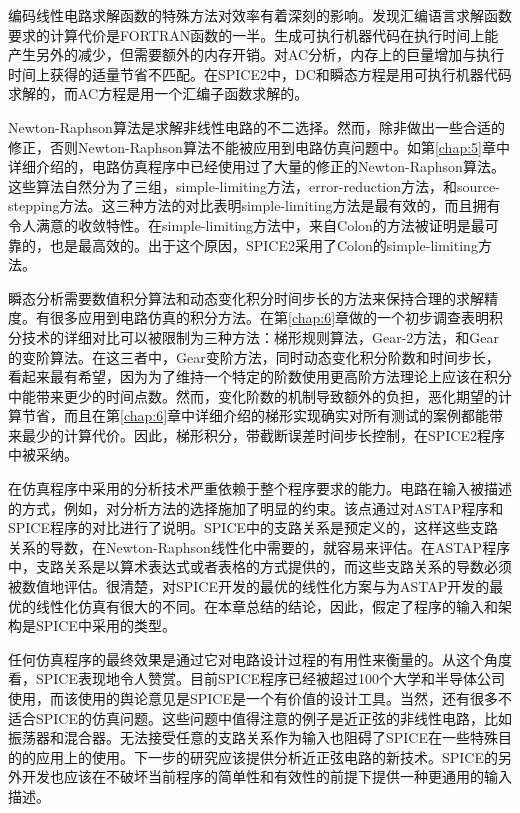 编码线性电路求解函数的特殊方法对效率有着深刻的影响。发现汇编语言求解函数要求的计算代价是FORTRAN函数的一半。生成可执行机器代码在执行时间上能产生另外的减少，但需要额外的内存开销。对AC分析，内存上的巨量增加与执行时间上获得的适量节省不匹配。在SPICE2中，DC和瞬态方程是用可执行机器代码求解的，而AC方程是用一个汇编子函数求解的。

Newton-Raphson算法是求解非线性电路的不二选择。然而，除非做出一些合适的修正，否则Newton-Raphson算法不能被应用到电路仿真问题中。如第\ref{chap:5}章中详细介绍的，电路仿真程序中已经使用过了大量的修正的Newton-Raphson算法。这些算法自然分为了三组，simple-limiting方法，error-reduction方法，和source-stepping方法。这三种方法的对比表明simple-limiting方法是最有效的，而且拥有令人满意的收敛特性。在simple-limiting方法中，来自Colon的方法被证明是最可靠的，也是最高效的。出于这个原因，SPICE2采用了Colon的simple-limiting方法。

瞬态分析需要数值积分算法和动态变化积分时间步长的方法来保持合理的求解精度。有很多应用到电路仿真的积分方法。在第\ref{chap:6}章做的一个初步调查表明积分技术的详细对比可以被限制为三种方法：梯形规则算法，Gear-2方法，和Gear的变阶算法。在这三者中，Gear变阶方法，同时动态变化积分阶数和时间步长，看起来最有希望，因为为了维持一个特定的阶数使用更高阶方法理论上应该在积分中能带来更少的时间点数。然而，变化阶数的机制导致额外的负担，恶化期望的计算节省，而且在第\ref{chap:6}章中详细介绍的梯形实现确实对所有测试的案例都能带来最少的计算代价。因此，梯形积分，带截断误差时间步长控制，在SPICE2程序中被采纳。

在仿真程序中采用的分析技术严重依赖于整个程序要求的能力。电路在输入被描述的方式，例如，对分析方法的选择施加了明显的约束。该点通过对ASTAP程序和SPICE程序的对比进行了说明。SPICE中的支路关系是预定义的，这样这些支路关系的导数，在Newton-Raphson线性化中需要的，就容易来评估。在ASTAP程序中，支路关系是以算术表达式或者表格的方式提供的，而这些支路关系的导数必须被数值地评估。很清楚，对SPICE开发的最优的线性化方案与为ASTAP开发的最优的线性化仿真有很大的不同。在本章总结的结论，因此，假定了程序的输入和架构是SPICE中采用的类型。

任何仿真程序的最终效果是通过它对电路设计过程的有用性来衡量的。从这个角度看，SPICE表现地令人赞赏。目前SPICE程序已经被超过100个大学和半导体公司使用，而该使用的舆论意见是SPICE是一个有价值的设计工具。当然，还有很多不适合SPICE的仿真问题。这些问题中值得注意的例子是近正弦的非线性电路，比如振荡器和混合器。无法接受任意的支路关系作为输入也阻碍了SPICE在一些特殊目的的应用上的使用。下一步的研究应该提供分析近正弦电路的新技术。SPICE的另外开发也应该在不破坏当前程序的简单性和有效性的前提下提供一种更通用的输入描述。